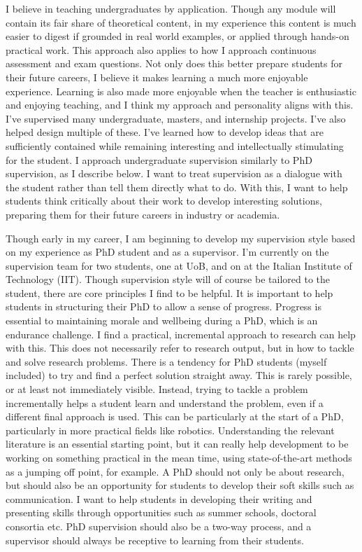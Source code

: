 \documentclass[12pt]{article}
\begin{document}
I believe in teaching undergraduates by application.
%
Though any module will contain its fair share of theoretical content, in my experience this content is much easier to digest if grounded in real world examples, or applied through hands-on practical work.
%
This approach also applies to how I approach continuous assessment and exam questions.
%
Not only does this better prepare students for their future careers, I believe it makes learning a much more enjoyable experience.
%
Learning is also made more enjoyable when the teacher is enthusiastic and enjoying teaching, and I think my approach and personality aligns with this.
%
I've supervised many undergraduate, masters, and internship projects.
%
I've also helped design multiple of these.
%
I've learned how to develop ideas that are sufficiently contained while remaining interesting and intellectually stimulating for the student.
%
I approach undergraduate supervision similarly to PhD supervision, as I describe below.
%
I want to treat supervision as a dialogue with the student rather than tell them directly what to do.
%
With this, I want to help students think critically about their work to develop interesting solutions, preparing them for their future careers in industry or academia.


Though early in my career, I am beginning to develop my supervision style based on my experience as PhD student and as a supervisor.
%
I'm currently on the supervision team for two students, one at UoB, and on at the Italian Institute of Technology (IIT).
%
Though supervision style will of course be tailored to the student, there are core principles I find to be helpful.
%
It is important to help students in structuring their PhD to allow a sense of progress.
%
Progress is essential to maintaining morale and wellbeing during a PhD, which is an endurance challenge.
%
I find a practical, incremental approach to research can help with this.
%
This does not necessarily refer to research output, but in how to tackle and solve research problems.
%
There is a tendency for PhD students (myself included) to try and find a perfect solution straight away.
%
This is rarely possible, or at least not immediately visible.
%
Instead, trying to tackle a problem incrementally helps a student learn and understand the problem, even if a different final approach is used.
%
This can be particularly at the start of a PhD, particularly in more practical fields like robotics.
%
Understanding the relevant literature is an essential starting point, but it can really help development to be working on something practical in the mean time, using state-of-the-art methods as a jumping off point, for example.
%
A PhD should not only be about research, but should also be an opportunity for students to develop their soft skills such as communication.
%
I want to help students in developing their writing and presenting skills through opportunities such as summer schools, doctoral consortia etc.
%
PhD supervision should also be a two-way process, and a supervisor should always be receptive to learning from their students.
\end{document}
